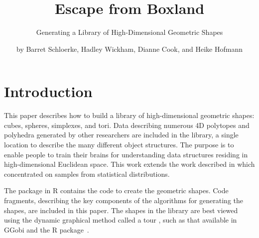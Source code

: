 \title{Escape from Boxland}
\subtitle{Generating a Library of High-Dimensional Geometric Shapes}
\author{by Barret Schloerke, Hadley Wickham, Dianne Cook, and Heike Hofmann}

\maketitle





\section{Introduction}

This paper describes how to build a library of high-dimensional
geometric shapes: cubes, spheres, simplexes, and tori. Data
describing numerous 4D polytopes and polyhedra generated by other
researchers are included in the library, a single location to describe the many different object structures. The purpose is to enable
people to train their brains for understanding data structures residing in
high-dimensional Euclidean space. This work extends the work described
in \cite{Co97} which concentrated on samples from statistical
distributions.

 The  package in R \citep{R03} contains
the code to create the geometric shapes. Code fragments, describing
the key components of the algorithms for generating the shapes, are
included in this paper. The shapes in the library are best viewed using the dynamic graphical method called a tour \citep{AS85,BCAH05,ClBW07}, such as that available in GGobi
\citep{STLBC02} and the  R package~\citep{WCHB11}.

